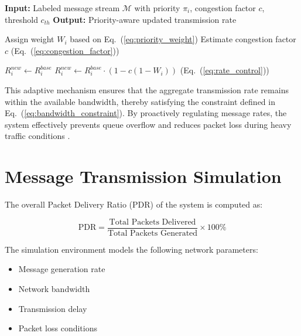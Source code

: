 \begin{algorithm}[H]
\caption{Priority-Aware Congestion Control and Scheduling}
\begin{algorithmic}[1]
\State \textbf{Input:} Labeled message stream $\mathcal{M}$ with 
       priority $\pi_i$, congestion factor $c$, threshold $c_{th}$
\State \textbf{Output:} Priority-aware updated transmission rate

    \State Assign weight $W_i$ based on Eq.~(\ref{eq:priority_weight})
    \State Estimate congestion factor $c$ (Eq.~(\ref{eq:congestion_factor}))
    
        \State $R_i^{new} \leftarrow R_i^{base}$
    \Else
        \State $R_i^{new} \leftarrow R_i^{base} \cdot (1 - c(1 - W_i))$
               (Eq.~(\ref{eq:rate_control}))
    \EndIf
\EndFor

\end{algorithmic}
\end{algorithm}

This adaptive mechanism ensures that the aggregate transmission 
rate remains within the available bandwidth, thereby satisfying 
the constraint defined in Eq.~(\ref{eq:bandwidth_constraint}). 
By proactively regulating message rates, the system effectively 
prevents queue overflow and reduces packet loss during heavy 
traffic conditions \cite{khan2020mlnetwork}.

\section{Message Transmission Simulation}

The overall Packet Delivery 
Ratio (PDR) of the system is computed as:

\begin{equation}
\text{PDR} = \frac{\text{Total Packets Delivered}}{\text{Total Packets Generated}} \times 100\%
\label{eq:pdr}
\end{equation}

The simulation environment models the following network parameters:

\begin{itemize}
\item Message generation rate
\item Network bandwidth
\item Transmission delay
\item Packet loss conditions
\end{itemize}



